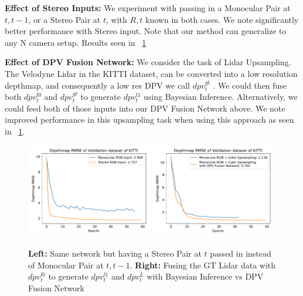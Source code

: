 \textbf{Effect of Stereo Inputs:} We experiment with passing in a Monocular Pair at $t, t-1$, or a Stereo Pair at $t$, with $R,t$ known in both cases. We note significantly better performance with Stereo input. Note that our method can generalize to any N camera setup. Results seen in ~\ref{fig:stereodpv}

\textbf{Effect of DPV Fusion Network:} We consider the task of Lidar Upsampling. The Velodyne Lidar in the KITTI dataset, can be converted into a low resolution depthmap, and consequently a low res DPV we call $dpv_{t}^{gt}$ . We could then fuse both $dpv_{t}^{l0}$ and $dpv_{t}^{gt}$ to generate $dpv_{t}^{l1}$ using Bayesian Inference. Alternatively, we could feed both of those inputs into our DPV Fusion Network above. We note improved performance in this upsampling task when using this approach as seen in ~\ref{fig:stereodpv}. 

\begin{figure}[h]
   \centering
   \begin{minipage}{0.5\textwidth}
       \centering
       \includegraphics[width=0.49\textwidth]{figures/Figure_6.pdf}
       \includegraphics[width=0.49\textwidth]{figures/Figure_7.pdf}
   \end{minipage}\hfill
   \centering
   \caption{ \textbf{Left:} Same network but having a Stereo Pair at $t$ passed in instead of Monocular Pair at $t, t-1$. \textbf{Right:} Fusing the GT Lidar data with $dpv_{t}^{l0}$ to generate $dpv_{t}^{l1}$ and $dpv_{t}^{L}$ with Bayesian Inference vs DPV Fusion Network}
   \label{fig:stereodpv} 
\end{figure}

